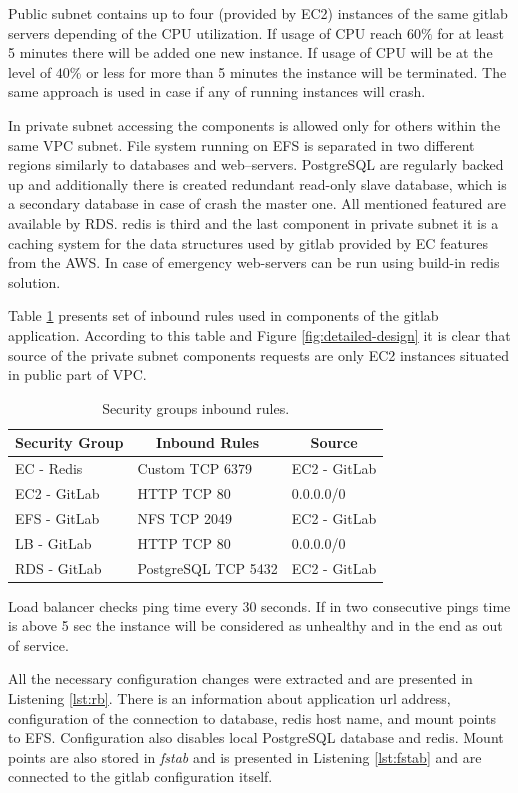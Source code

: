 	Public subnet contains up to four (provided by \gls{EC2}) instances of the same \gls{gitlab} servers depending of the CPU utilization. If usage of CPU reach $60\%$ for at least 5 minutes there will be added one new instance. If usage of CPU will be at the level of $40\%$ or less for more than 5 minutes the instance will be terminated. The same approach is used in case if any of running instances will crash.
	
	In private subnet accessing the components is allowed only for others within the same \gls{VPC} subnet. File system running on \gls{EFS} is separated in two different regions similarly to databases and web--servers. PostgreSQL are regularly backed up and additionally there is created redundant read-only slave database, which is a secondary database in case of crash the master one. All mentioned featured are available by \gls{RDS}. \gls{redis} is third and the last component in private subnet it is a caching system for the data structures used by \gls{gitlab} provided by \gls{EC} features from the \gls{AWS}. In case of emergency web-servers can be run using build-in \gls{redis} solution.
	
	Table \ref{tab:security-groups} presents set of inbound rules used in components of the \gls{gitlab} application. According to this table and Figure \ref{fig:detailed-design} it is clear that source of the private subnet components requests are only \gls{EC2} instances situated in public part of \gls{VPC}.
	\begin{table}[!htbp]
		\centering
		\caption{Security groups inbound rules.}
		\label{tab:security-groups}
		\begin{tabular}{|l|l|l|}
			\hline
			\multicolumn{1}{|c|}{\textbf{Security Group}} & \multicolumn{1}{c|}{\textbf{Inbound Rules}} & \multicolumn{1}{c|}{\textbf{Source}} \\ \hline
			EC - Redis & Custom TCP 6379 & EC2 - GitLab \\ \hline
			EC2 - GitLab & HTTP TCP 80 & 0.0.0.0/0 \\ \hline
			EFS - GitLab & NFS TCP 2049 & EC2 - GitLab \\ \hline
			LB - GitLab & HTTP TCP 80 & 0.0.0.0/0 \\ \hline
			RDS - GitLab & PostgreSQL TCP 5432 & EC2 - GitLab \\ \hline
		\end{tabular}
	\end{table}
	
	Load balancer checks ping time every $30$ seconds. If in two consecutive pings time is above 5 sec the instance will be considered as unhealthy and in the end as out of service.
	
	All the necessary configuration changes were extracted and are presented in Listening \ref{lst:rb}. There is an information about application url address, configuration of the connection to database, \gls{redis} host name, and mount points to \gls{EFS}. Configuration also disables local PostgreSQL database and \gls{redis}. Mount points are also stored in \emph{fstab} and is presented in Listening \ref{lst:fstab} and are connected to the \gls{gitlab} configuration itself.